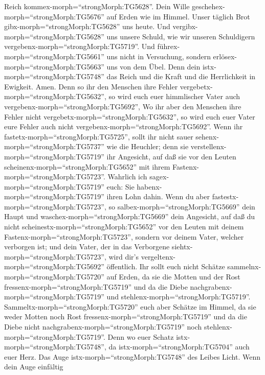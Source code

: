 Reich kommex-morph=``strongMorph:TG5628''. Dein Wille
geschehex-morph=``strongMorph:TG5676'' auf Erden wie im Himmel.
 Unser täglich Brot gibx-morph=``strongMorph:TG5628'' uns
heute.  Und vergibx-morph=``strongMorph:TG5628'' uns unsere
Schuld, wie wir unseren Schuldigern
vergebenx-morph=``strongMorph:TG5719''.  Und
führex-morph=``strongMorph:TG5661'' uns nicht in Versuchung, sondern
erlösex-morph=``strongMorph:TG5663'' uns von dem Übel. Denn dein
istx-morph=``strongMorph:TG5748'' das Reich und die Kraft und die
Herrlichkeit in Ewigkeit. Amen.  Denn so ihr den Menschen
ihre Fehler vergebetx-morph=``strongMorph:TG5632'', so wird euch euer
himmlischer Vater auch vergebenx-morph=``strongMorph:TG5692'',
 Wo ihr aber den Menschen ihre Fehler nicht
vergebetx-morph=``strongMorph:TG5632'', so wird euch euer Vater eure
Fehler auch nicht vergebenx-morph=``strongMorph:TG5692''. 
Wenn ihr fastetx-morph=``strongMorph:TG5725'', sollt ihr nicht sauer
sehenx-morph=``strongMorph:TG5737'' wie die Heuchler; denn sie
verstellenx-morph=``strongMorph:TG5719'' ihr Angesicht, auf daß sie vor
den Leuten scheinenx-morph=``strongMorph:TG5652'' mit ihrem
Fastenx-morph=``strongMorph:TG5723''. Wahrlich ich
sagex-morph=``strongMorph:TG5719'' euch: Sie
habenx-morph=``strongMorph:TG5719'' ihren Lohn dahin.  Wenn
du aber fastestx-morph=``strongMorph:TG5723'', so
salbex-morph=``strongMorph:TG5669'' dein Haupt und
waschex-morph=``strongMorph:TG5669'' dein Angesicht,  auf
daß du nicht scheinestx-morph=``strongMorph:TG5652'' vor den Leuten mit
deinem Fastenx-morph=``strongMorph:TG5723'', sondern vor deinem Vater,
welcher verborgen ist; und dein Vater, der in das Verborgene
siehtx-morph=``strongMorph:TG5723'', wird dir's
vergeltenx-morph=``strongMorph:TG5692'' öffentlich.  Ihr
sollt euch nicht Schätze sammelnx-morph=``strongMorph:TG5720'' auf
Erden, da sie die Motten und der Rost
fressenx-morph=``strongMorph:TG5719'' und da die Diebe
nachgrabenx-morph=``strongMorph:TG5719'' und
stehlenx-morph=``strongMorph:TG5719''. 
Sammeltx-morph=``strongMorph:TG5720'' euch aber Schätze im Himmel, da
sie weder Motten noch Rost fressenx-morph=``strongMorph:TG5719'' und da
die Diebe nicht nachgrabenx-morph=``strongMorph:TG5719'' noch
stehlenx-morph=``strongMorph:TG5719''.  Denn wo euer Schatz
istx-morph=``strongMorph:TG5748'', da istx-morph=``strongMorph:TG5704''
auch euer Herz.  Das Auge istx-morph=``strongMorph:TG5748''
des Leibes Licht. Wenn dein Auge einfältig
